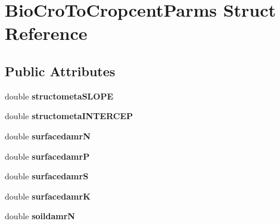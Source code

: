 \hypertarget{struct_bio_cro_to_cropcent_parms}{\section{Bio\-Cro\-To\-Cropcent\-Parms Struct Reference}
\label{struct_bio_cro_to_cropcent_parms}
}
\subsection*{Public Attributes}
\begin{DoxyCompactItemize}
\item 
\hypertarget{struct_bio_cro_to_cropcent_parms_a55dbd82fe267f1eb7499750776a62648}{double {\bfseries structometa\-S\-L\-O\-P\-E}}\label{struct_bio_cro_to_cropcent_parms_a55dbd82fe267f1eb7499750776a62648}

\item 
\hypertarget{struct_bio_cro_to_cropcent_parms_a0c3bc0643baa21cbdea0b0f71f99618e}{double {\bfseries structometa\-I\-N\-T\-E\-R\-C\-E\-P}}\label{struct_bio_cro_to_cropcent_parms_a0c3bc0643baa21cbdea0b0f71f99618e}

\item 
\hypertarget{struct_bio_cro_to_cropcent_parms_aed906516b63d351ea5c2d1539dace505}{double {\bfseries surfacedamr\-N}}\label{struct_bio_cro_to_cropcent_parms_aed906516b63d351ea5c2d1539dace505}

\item 
\hypertarget{struct_bio_cro_to_cropcent_parms_abf02111a00f5932567bdd49ee2ae5fe7}{double {\bfseries surfacedamr\-P}}\label{struct_bio_cro_to_cropcent_parms_abf02111a00f5932567bdd49ee2ae5fe7}

\item 
\hypertarget{struct_bio_cro_to_cropcent_parms_a9d763f9967ea0b9be7b616b6a2be007e}{double {\bfseries surfacedamr\-S}}\label{struct_bio_cro_to_cropcent_parms_a9d763f9967ea0b9be7b616b6a2be007e}

\item 
\hypertarget{struct_bio_cro_to_cropcent_parms_adf8855cc4ba9b163b1c488079d0c598e}{double {\bfseries surfacedamr\-K}}\label{struct_bio_cro_to_cropcent_parms_adf8855cc4ba9b163b1c488079d0c598e}

\item 
\hypertarget{struct_bio_cro_to_cropcent_parms_aa55548ea856e09397d6f82af8910a491}{double {\bfseries soildamr\-N}}\label{struct_bio_cro_to_cropcent_parms_aa55548ea856e09397d6f82af8910a491}


\end{DoxyCompactItemize}
